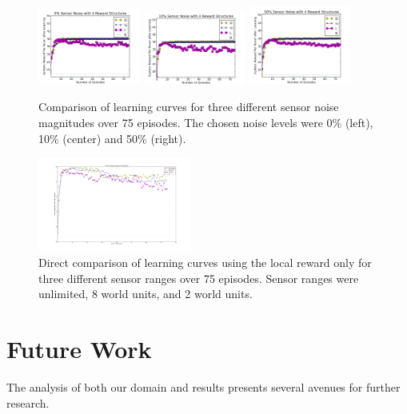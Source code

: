 \documentclass[letterpaper, 10 pt, conference]{ieeeconf}  %
\begin{document}
\begin{figure}
    \centering
    \includegraphics[width=0.3\textwidth]{SN_0.png}
    \includegraphics[width=0.3\textwidth]{SN_10.png}
    \includegraphics[width=0.3\textwidth]{SN_50.png}
    \caption{Comparison of learning curves for three different sensor noise magnitudes over 75 episodes. The chosen noise levels were 0\% (left), 10\% (center) and 50\% (right). }
    \label{fig:sensor-noise}
\end{figure}

\begin{figure}
    \centering
    \includegraphics[width=0.45\textwidth]{SR_LocalReward.png}
    \caption{Direct comparison of learning curves using the local reward only for three different sensor ranges over 75 episodes. Sensor ranges were unlimited, 8 world units, and 2 world units. }
    \label{fig:local-reward-comparison}
\end{figure}

\section{Future Work}
The analysis of both our domain and results presents several avenues for further research.
\end{document}

